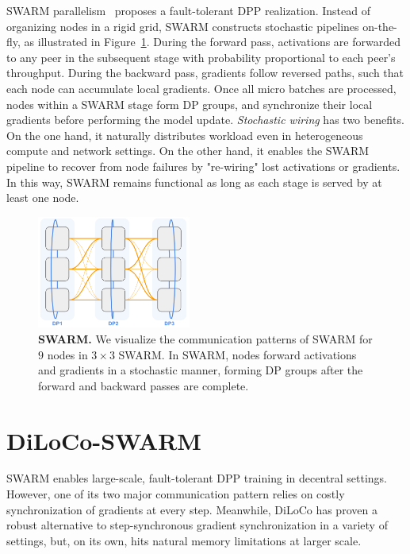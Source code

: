 \documentclass{article}
\begin{document}
SWARM parallelism~\cite{ryabinin2023swarm} proposes a fault-tolerant DPP
realization. Instead of organizing nodes in a rigid grid, SWARM constructs
stochastic pipelines on-the-fly, as illustrated in Figure~\ref{fig:swarm}.
During the forward pass, activations are forwarded to any peer in the subsequent
stage with probability proportional to each peer's throughput. During the
backward pass, gradients follow reversed paths, such that each node can
accumulate local gradients. Once all micro batches are processed, nodes within a
SWARM stage form DP groups, and synchronize their local gradients before
performing the model update. \textit{Stochastic wiring} has two benefits. On the
one hand, it naturally distributes workload even in heterogeneous compute and
network settings. On the other hand, it enables the SWARM pipeline to recover
from node failures by "re-wiring" lost activations or gradients. In this way,
SWARM remains functional as long as each stage is served by at least one node.
\begin{figure}[ht]
    \centering
    \includegraphics[width=0.45\textwidth]{figures/swarm.png}
    \caption{\textbf{SWARM.} We visualize the communication patterns of SWARM
    for $9$ nodes in $3\times 3$ SWARM. In SWARM, nodes forward activations and
    gradients in a stochastic manner, forming DP groups after the forward and
    backward passes are complete.}
    \label{fig:swarm}
\end{figure}

\section{DiLoCo-SWARM}

SWARM enables large-scale, fault-tolerant DPP training in decentral settings.
However, one of its two major communication pattern relies on costly
synchronization of gradients at every step. Meanwhile, DiLoCo has proven a
robust alternative to step-synchronous gradient synchronization in a variety of
settings, but, on its own, hits natural memory limitations at larger scale.
\end{document}
